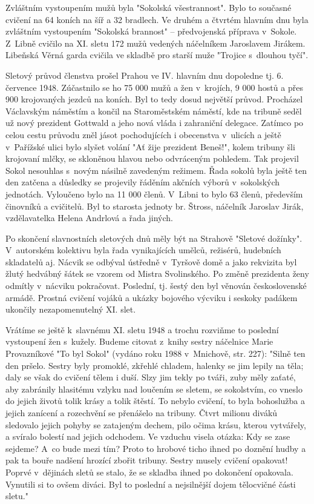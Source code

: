 \documentclass[a5paper, 11pt, twoside]{article}
\begin{document}
Zvláštním vystoupením mužů byla "Sokolská všestrannost". Bylo to
současné cvičení na 64 koních na šíř a 32 bradlech. Ve druhém a čtvrtém
hlavním dnu byla zvláštním vystoupením "Sokolská brannost" --
předvojenská příprava v~Sokole. Z~Libně cvičilo na XI. sletu 172 mužů
vedených náčelníkem Jaroslavem Jirákem. Libeňská Věrná garda cvičila ve
skladbě pro starší muže "Trojice s~dlouhou tyčí".

Sletový průvod členstva prošel Prahou ve IV. hlavním dnu dopoledne tj.
6. července 1948. Zúčastnilo se ho 75 000 mužů a žen v~krojích, 9 000
hostů a přes 900 krojovaných jezdců na koních. Byl to tedy dosud
největší průvod. Procházel Václavským náměstím a končil na Staroměstském
náměstí, kde na tribuně seděl už nový prezident Gottwald a jeho nová
vláda i zahraniční delegace. Zatímco po celou cestu průvodu zněl jásot
pochodujících i obecenstva v~ulicích a ještě v~Pařížské ulici bylo
slyšet volání "Ať žije prezident Beneš!", kolem tribuny šli krojovaní
mlčky, se skloněnou hlavou nebo odvráceným pohledem. Tak projevil Sokol
nesouhlas s~novým násilně zavedeným režimem. Řada sokolů byla ještě ten
den zatčena a důsledky se projevily řáděním akčních výborů v~sokolských
jednotách. Vyloučeno bylo na 11 000 členů. V~Libni to bylo 63 členů,
především činovníků a cvičitelů. Byl to starosta jednoty br. Štross,
náčelník Jaroslav Jirák, vzdělavatelka Helena Andrlová a řada jiných.

Po skončení slavnostních sletových dnů měly být na Strahově "Sletové
dožínky". V~autorském kolektivu byla řada vynikajících umělců,
režisérů, hudebních skladatelů aj. Nácvik se odbýval ústředně v~Tyršově
domě a jako rekvizita byl žlutý hedvábný šátek se vzorem od Mistra
Svolinského. Po změně prezidenta ženy odmítly v~nácviku pokračovat.
Poslední, tj. šestý den byl věnován československé armádě. Prostná
cvičení vojáků a ukázky bojového výcviku i seskoky padákem ukončily
nezapomenutelný XI. slet.

Vrátíme se ještě k~slavnému XI. sletu 1948 a trochu rozviňme to poslední
vystoupení žen s~kužely. Budeme citovat z~knihy sestry náčelnice Marie
Provazníkové "To byl Sokol" (vydáno roku 1988 v~Mnichově, str. 227):
"Silně ten den pršelo. Sestry byly promoklé, zkřehlé chladem, halenky se
jim lepily na těla; daly se však do cvičení tělem i duší. Slzy jim tekly
po tváři, zuby měly zaťaté, aby zabránily hlasitému vzlyku nad loučením
se sletem, se sokolstvím, co vneslo do jejich životů tolik krásy a tolik
štěstí. To nebylo cvičení, to byla bohoslužba a jejich zanícení a
rozechvění se přenášelo na tribuny. Čtvrt milionu diváků sledovalo
jejich pohyby se zatajeným dechem, pilo očima krásu, kterou vytvářely, a
svíralo bolestí nad jejich odchodem. Ve vzduchu visela otázka: Kdy se
zase sejdeme? A~co bude mezi tím? Proto to hrobové ticho ihned po
doznění hudby a pak ta bouře nadšení hrozící zbořit tribuny. Sestry
musely cvičení opakovat! Poprvé v~dějinách sletů se stalo, že se skladba
ihned po dokončení opakovala. Vynutili si to ovšem diváci. Byl to
poslední a nejsilnější dojem tělocvičné části sletu."
\end{document}
